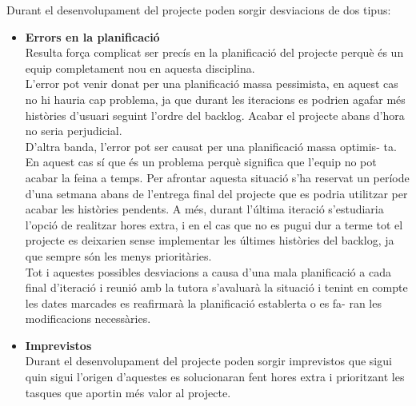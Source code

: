 Durant el desenvolupament del projecte poden sorgir desviacions de dos tipus:
\begin{itemize}

\item{}\textbf{Errors en la planificació}\\
Resulta força complicat ser precís en la planificació del projecte perquè és un equip completament nou en aquesta disciplina.\\

L'error pot venir donat per una planificació massa pessimista, en aquest
cas no hi hauria cap problema, ja que durant les iteracions es podrien agafar més històries d'usuari seguint l'ordre del backlog. Acabar el projecte abans d'hora no seria perjudicial.\\

D'altra banda, l'error pot ser causat per una planificació massa optimis-
ta. En aquest cas sí que és un problema perquè significa que l'equip no
pot acabar la feina a temps. Per afrontar aquesta situació s'ha reservat un
període d'una setmana abans de l'entrega final del projecte que es podria
utilitzar per acabar les històries pendents. A més, durant l'última iteració s'estudiaria l'opció de realitzar hores extra, i en el cas que no es pugui dur a terme tot el projecte es deixarien sense implementar les últimes històries del backlog, ja que sempre són les menys prioritàries.\\

Tot i aquestes possibles desviacions a causa d'una mala planificació a cada final d'iteració i reunió amb la tutora s'avaluarà la situació i tenint en
compte les dates marcades es reafirmarà la planificació establerta o es fa-
ran les modificacions necessàries.

\item{}\textbf{Imprevistos}\\
Durant el desenvolupament del projecte poden sorgir imprevistos que
sigui quin sigui l'origen d'aquestes es solucionaran fent hores extra i prioritzant les tasques que aportin més valor al projecte.

\end{itemize}